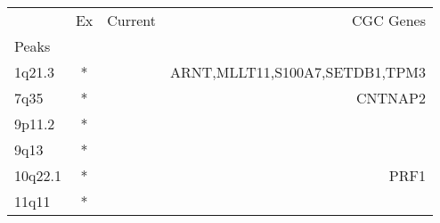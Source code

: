 \begin{tabular}{lccr}
\toprule
{} & Ex & Current &                       CGC Genes \\
Peaks   &    &         &                                 \\
\midrule
1q21.3  &  * &         &  ARNT,MLLT11,S100A7,SETDB1,TPM3 \\
7q35    &  * &         &                         CNTNAP2 \\
9p11.2  &  * &         &                                 \\
9q13    &  * &         &                                 \\
10q22.1 &  * &         &                            PRF1 \\
11q11   &  * &         &                                 \\
\bottomrule
\end{tabular}
